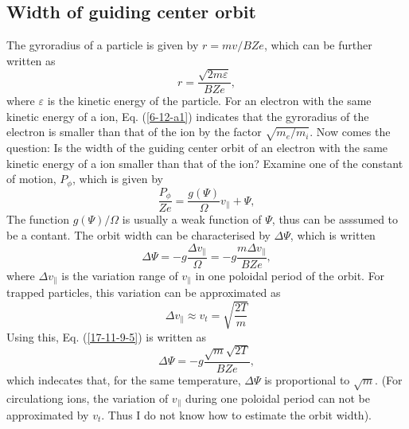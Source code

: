 \documentclass{article}
\begin{document}
\subsection{Width of guiding center orbit}

The gyroradius of a particle is given by $r = m v / B Z e$, which can be
further written as
\begin{equation}
  \label{6-12-a1} r = \frac{\sqrt{2 m \varepsilon}}{B Z e},
\end{equation}
where $\varepsilon$ is the kinetic energy of the particle. For an electron
with the same kinetic energy of a ion, Eq. (\ref{6-12-a1}) indicates that the
gyroradius of the electron is smaller than that of the ion by the factor
$\sqrt{m_e / m_i}$. Now comes the question: Is the width of the guiding center
orbit of an electron with the same kinetic energy of a ion smaller than that
of the ion? Examine one of the constant of motion, $P_{\phi}$, which is given
by
\begin{equation}
  \frac{P_{\phi}}{Z e} = \frac{g (\Psi) }{\Omega} v_{\parallel} + \Psi,
\end{equation}
The function $g (\Psi) / \Omega$ is usually a weak function of $\Psi$, thus
can be asssumed to be a contant. The orbit width can be characterised by
$\Delta \Psi$, which is written
\begin{equation}
  \label{17-11-9-5} \Delta \Psi = - g \frac{\Delta v_{\parallel}}{\Omega} = -
  g \frac{m \Delta v_{\parallel}}{B Z e},
\end{equation}
where $\Delta v_{\parallel}$ is the variation range of $v_{\parallel}$ in one
poloidal period of the orbit. For trapped particles, this variation can be
approximated as
\begin{equation}
  \Delta v_{\parallel} \approx v_t = \sqrt{\frac{2 T}{m}}
\end{equation}
Using this, Eq. (\ref{17-11-9-5}) is written as
\begin{equation}
  \label{17-11-9-7} \Delta \Psi = - g \frac{\sqrt{m} \sqrt{2 T} }{B Z e},
\end{equation}
which indecates that, for the same temperature, $\Delta \Psi$ is proportional
to $\sqrt{m}$. (For circulationg ions, the variation of $v_{\parallel}$ during
one poloidal period can not be approximated by $v_t$. Thus I do not know how
to estimate the orbit width).
\end{document}
